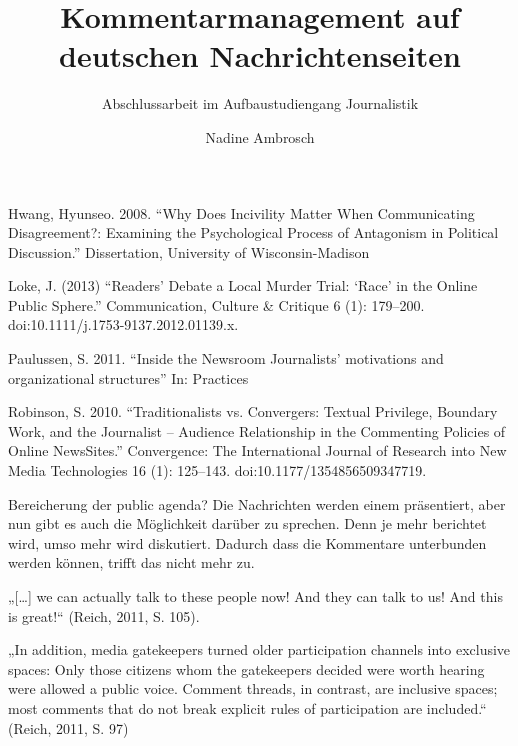 \documentclass[12pt,parskip=full]{scrreprt} %
\title{Kommentarmanagement auf deutschen Nachrichtenseiten}
\subtitle{Abschlussarbeit im Aufbaustudiengang Journalistik}
\author{Nadine Ambrosch}
\begin{document}
\begin{spacing}{1}
  \maketitle
\end{spacing}







Hwang, Hyunseo. 2008. “Why Does Incivility Matter When Communicating Disagreement?:
Examining the Psychological Process of Antagonism in Political Discussion.” Dissertation,
University of Wisconsin-Madison

Loke, J. (2013) “Readers’ Debate a Local Murder Trial: ‘Race’ in the Online
Public Sphere.” Communication, Culture \& Critique 6 (1): 179–200.
doi:10.1111/j.1753-9137.2012.01139.x.

Paulussen, S. 2011. ``Inside the Newsroom Journalists’ motivations and organizational structures'' In: Practices


Robinson, S. 2010. “Traditionalists vs. Convergers: Textual Privilege, Boundary Work, and the
Journalist – Audience Relationship in the Commenting Policies of Online NewsSites.”
Convergence: The International Journal of Research into New Media Technologies 16 (1):
125–143. doi:10.1177/1354856509347719.


Bereicherung der public agenda? Die Nachrichten werden einem präsentiert, aber
nun gibt es auch die Möglichkeit darüber zu sprechen. Denn je mehr berichtet
wird, umso mehr wird diskutiert. Dadurch dass die Kommentare unterbunden werden
können, trifft das nicht mehr zu.

 

„[\ldots] we can actually talk to these people now! And they can talk to us! And
this is great!“ (Reich, 2011, S. 105).

„In addition, media gatekeepers  turned older participation channels into
exclusive spaces: Only those citizens whom the gatekeepers decided were
worth hearing were allowed a public voice. Comment threads, in contrast,
are inclusive spaces; most comments that do not break explicit rules of
participation are included.“ (Reich, 2011, S. 97)





\end{document}

